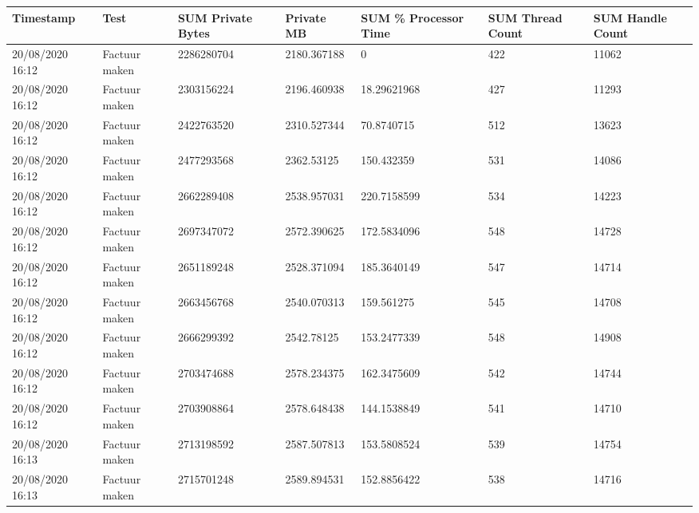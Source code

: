 \begin{tiny}
\begin{longtable}{lllllll}
    Timestamp        & Test                  & SUM Private Bytes & Private MB  & SUM \% Processor Time & SUM Thread Count & SUM Handle Count \\
    \endhead
    20/08/2020 16:12 & Factuur maken         & 2286280704        & 2180.367188 & 0                     & 422              & 11062            \\
    20/08/2020 16:12 & Factuur maken         & 2303156224        & 2196.460938 & 18.29621968           & 427              & 11293            \\
    20/08/2020 16:12 & Factuur maken         & 2422763520        & 2310.527344 & 70.8740715            & 512              & 13623            \\
    20/08/2020 16:12 & Factuur maken         & 2477293568        & 2362.53125  & 150.432359            & 531              & 14086            \\
    20/08/2020 16:12 & Factuur maken         & 2662289408        & 2538.957031 & 220.7158599           & 534              & 14223            \\
    20/08/2020 16:12 & Factuur maken         & 2697347072        & 2572.390625 & 172.5834096           & 548              & 14728            \\
    20/08/2020 16:12 & Factuur maken         & 2651189248        & 2528.371094 & 185.3640149           & 547              & 14714            \\
    20/08/2020 16:12 & Factuur maken         & 2663456768        & 2540.070313 & 159.561275            & 545              & 14708            \\
    20/08/2020 16:12 & Factuur maken         & 2666299392        & 2542.78125  & 153.2477339           & 548              & 14908            \\
    20/08/2020 16:12 & Factuur maken         & 2703474688        & 2578.234375 & 162.3475609           & 542              & 14744            \\
    20/08/2020 16:12 & Factuur maken         & 2703908864        & 2578.648438 & 144.1538849           & 541              & 14710            \\
    20/08/2020 16:13 & Factuur maken         & 2713198592        & 2587.507813 & 153.5808524           & 539              & 14754            \\
    20/08/2020 16:13 & Factuur maken         & 2715701248        & 2589.894531 & 152.8856422           & 538              & 14716            \\

\end{longtable}
\end{tiny}
